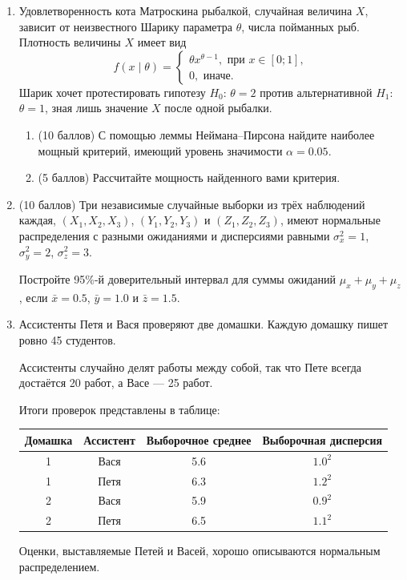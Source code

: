 \begin{enumerate}
	
	
	\item Удовлетворенность кота Матроскина рыбалкой, случайная величина $X$, зависит от неизвестного Шарику параметра $\theta$, числа пойманных рыб. 
	Плотность величины $X$ имеет вид 
	\[
	f(x \mid \theta) = \begin{cases}
	\theta x^{\theta-1}, \text{ при } x\in [0;1], \\
	0, \text{ иначе.}
	\end{cases}
	\]
	Шарик хочет протестировать гипотезу $H_0$: $\theta = 2$ против альтернативной $H_1$: $\theta=1$, зная лишь значение $X$ после одной рыбалки. 
	\begin{enumerate}
	\item (10 баллов) С помощью леммы Неймана–Пирсона найдите наиболее мощный критерий, имеющий уровень значимости $\alpha=0.05$.
	\item (5 баллов) Рассчитайте мощность найденного вами критерия.
	\end{enumerate}
		
	\item (10 баллов) Три независимые случайные выборки из трёх наблюдений каждая, $(X_1, X_2, X_3)$, $(Y_1, Y_2, Y_3)$ и $(Z_1, Z_2, Z_3)$,
	имеют нормальные распределения с разными ожиданиями и дисперсиями равными $\sigma^2_x=1$, $\sigma^2_y=2$, $\sigma^2_z=3$. 
	
	Постройте 95\%-й доверительный интервал для суммы ожиданий $\mu_x + \mu_y + \mu_z$, если $\bar x= 0.5$, $\bar y= 1.0$ и $\bar z= 1.5$.
	
	
	\item Ассистенты Петя и Вася проверяют две домашки.
	Каждую домашку пишет ровно 45 студентов.
	
	Ассистенты случайно делят работы между собой, так что Пете всегда достаётся 20 работ, а Васе — 25 работ.
	
	Итоги проверок представлены в таблице:
	
	\begin{tabular}{cccc}
	\toprule
	Домашка & Ассистент & Выборочное среднее & Выборочная дисперсия \\
	\midrule 
	1 & Вася & 5.6 & $1.0^2$ \\
	1 & Петя & 6.3 & $1.2^2$ \\
	2 & Вася & 5.9 & $0.9^2$ \\
	2 & Петя & 6.5 & $1.1^2$ \\
	\bottomrule
	\end{tabular}
	
	Оценки, выставляемые Петей и Васей, хорошо описываются нормальным распределением.
	

\end{enumerate}
